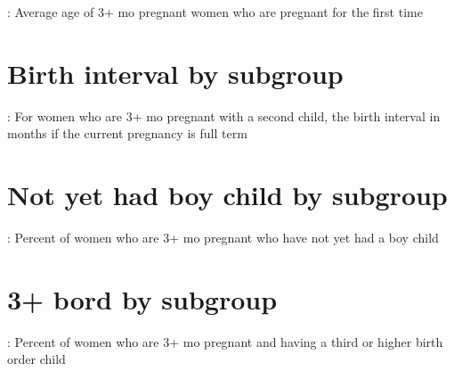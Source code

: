 \documentclass{article}
\begin{document}
\begin{table}[H]
    \centering
    \setlength{\tabcolsep}{4pt} %
    \footnotesize %
    \caption{: Average age of 3+ mo pregnant women who are pregnant for the first time}
    \label{tab:sumstat}
    \begin{adjustbox}{width=\textwidth}
        
    \end{adjustbox}
\end{table}


\section{Birth interval by subgroup}

\begin{table}[H]
    \centering
    \setlength{\tabcolsep}{4pt} %
    \footnotesize %
    \caption{: For women who are 3+ mo pregnant with a second child, the birth interval in months if the current pregnancy is full term}
    \label{tab:sumstat}
    \begin{adjustbox}{width=\textwidth}
        
    \end{adjustbox}
\end{table}


\section{Not yet had boy child by subgroup}

\begin{table}[H]
    \centering
    \setlength{\tabcolsep}{4pt} %
    \footnotesize %
    \caption{: Percent of  women who are 3+ mo pregnant who have not yet had a boy child}
    \label{tab:sumstat}
    \begin{adjustbox}{width=\textwidth}
        
    \end{adjustbox}
\end{table}

\section{3+ bord by subgroup}

\begin{table}[H]
    \centering
    \setlength{\tabcolsep}{4pt} %
    \footnotesize %
    \caption{: Percent of women who are 3+ mo pregnant and having a third or higher birth order child}
    \label{tab:sumstat}
    \begin{adjustbox}{width=\textwidth}
        
    \end{adjustbox}
\end{table}
\end{document}
